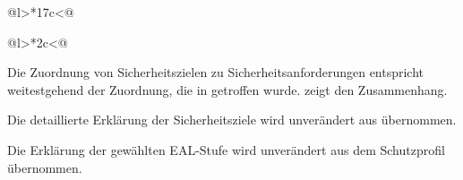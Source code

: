 \begin{longtable}[c]{@{}l>{\centering}*{17}{c}<{\centering}@{}}
  \toprule
   \\
  \midrule \endhead
  \midrule \caption{Abbildung der Subjekte auf SFR}  \endfoot
  \bottomrule \caption{Abbildung der Subjekte auf SFR} \label{tab:sfr.subjobj2sfr} \endlastfoot
\end{longtable}

\begin{longtable}[c]{@{}l>{\centering}*{2}{c}<{\centering}@{}}
  \toprule
   \\
  \midrule \endhead
  \midrule \caption{Abbildung der SFR auf Subjekte}  \endfoot
  \bottomrule \caption{Abbildung der SFR auf Subjekte} \label{tab:sfr.sfr2subjobj} \endlastfoot
\end{longtable}





Die Zuordnung von Sicherheitszielen zu Sicherheitsanforderungen entspricht
weitestgehend der Zuordnung, die in \citepp{} getroffen
wurde.  zeigt den Zusammenhang.

\afterpage{%
  \clearpage%
  \centering %
}


Die detaillierte Erklärung der Sicherheitsziele wird unverändert aus \citepp{}
übernommen.


Die Erklärung der gewählten EAL-Stufe wird unverändert aus dem Schutzprofil
\citepp{} übernommen.


